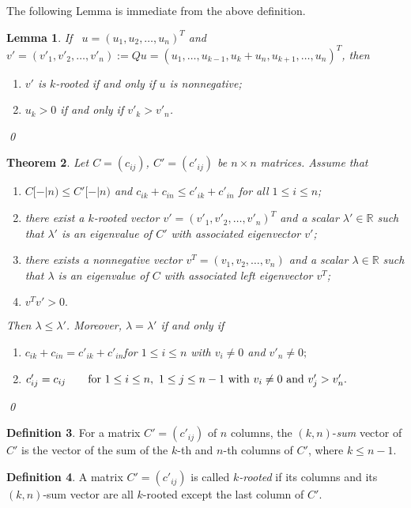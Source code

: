\documentclass[12pt]{report}%
\theoremstyle{plain}
\newtheorem{thm}{Theorem}[chapter]
\newtheorem{lem}[thm]{Lemma}
\theoremstyle{definition}
\newtheorem{defn}[thm]{Definition}
\begin{document}
The following Lemma is immediate from the above definition.
\bigskip

\begin{lem}
If ~$u=(u_1, u_2, \ldots, u_n)^T$ and $v'=(v'_1, v'_2, \ldots, v'_n):=Qu=(u_1,\ldots, u_{k-1},u_k+u_n, u_{k+1}, \ldots,  u_n)^T$, then
\begin{enumerate}
\item[(i)] $v'$ is $k$-rooted  if and only if  $u$ is nonnegative;
\item[(ii)] $u_k>0$ if and only if $v'_k>v'_n$.
\end{enumerate}
\qed
\end{lem}



\begin{thm} \label{thm_main}
    Let $C=(c_{ij})$, $C'=(c'_{ij})$ be  $n\times n$ matrices.
Assume that
\begin{enumerate}
\item[(i)]   $C[-|n)\leq C'[-|n)$ and $c_{ik}+c_{in}\leq c'_{ik}+c'_{in}$ for all $1\leq i\leq n$;
\item[(ii)] there exist a $k$-rooted vector $v'=(v'_1, v'_2, \ldots, v'_n)^T$ and a scalar $\lambda'\in \mathbb{R}$
such that $\lambda'$ is an eigenvalue of $C'$ with associated eigenvector $v'$;
\item[(iii)] there exists a nonnegative vector $v^T=(v_1, v_2, \ldots, v_n)$ and a scalar $\lambda\in \mathbb{R}$ such that $\lambda$ is an eigenvalue of $C$ with associated left eigenvector $v^T$;
\item[(iv)] $v^Tv'>0.$
\end{enumerate}
 Then $\lambda\leq \lambda'$.
Moreover, $\lambda=\lambda'$
if and only if
\begin{enumerate}
\item[(a)] $c_{ik}+c_{in}=c'_{ik}+c'_{in}$\qquad for $1\leq i\leq n$ with $v_i\not=0$ and $v'_n\not=0;$
\item[(b)]
$c'_{ij}=c_{ij}\qquad \hbox{for~}1\leq i\leq n,~1\leq j\leq n-1 \hbox{~with~} v_i\ne 0 \hbox{~and~} v'_j> v'_n.$
\end{enumerate} \qed
\end{thm}


\begin{defn}
For a matrix $C'=(c'_{ij})$ of $n$ columns, the $(k, n)$-{\it sum} vector of $C'$ is the vector of the sum of the $k$-th and  $n$-th columns of $C'$, where $k\leq n-1$.
\end{defn}

\begin{defn}\label{m_rooted}
A  matrix $C'=(c'_{ij})$ is called {\it $k$-rooted}  if its  columns and its $(k, n)$-sum vector are all $k$-rooted except the last column of $C'$.
\end{defn}
\end{document}
